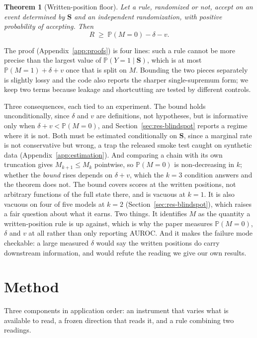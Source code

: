 \documentclass{article}
\newtheorem{theorem}{Theorem}
\newcommand{\gate}{\mathbf{S}}
\begin{document}
\begin{theorem}[Written-position floor]
\label{thm:floor}
Let a rule, randomized or not, accept on an event determined by $\gate$ and an independent
randomization, with positive probability of accepting. Then
\[
R\;\ge\;\mathbb{P}(M=0)-\delta-v .
\]
\end{theorem}

The proof (Appendix~\ref{app:proofs}) is four lines: such a rule cannot be more precise than the
largest value of $\mathbb{P}(Y=1\mid\gate)$, which is at most $\mathbb{P}(M=1)+\delta+v$ once that is
split on $M$. Bounding the two pieces separately is slightly lossy and the code also reports the
sharper single-supremum form; we keep two terms because leakage and shortcutting are tested by
different controls.

Three consequences, each tied to an experiment. The bound holds unconditionally, since $\delta$ and
$v$ are definitions, not hypotheses, but is informative only when $\delta+v<\mathbb{P}(M{=}0)$, and
Section~\ref{sec:res-blindspot} reports a regime where it is not. Both must be estimated conditionally
on $\gate$, since a marginal rate is not conservative but wrong, a trap the released smoke test caught
on synthetic data (Appendix~\ref{app:estimation}). And comparing a chain with its own truncation gives
$M_{k+1}\le M_k$ pointwise, so $\mathbb{P}(M{=}0)$ is non-decreasing in $k$; whether the \emph{bound}
rises depends on $\delta+v$, which the $k{=}3$ condition answers and the theorem does not. The bound
covers scores at the written positions, not arbitrary functions of the full state there, and is
vacuous at $k=1$. It is also vacuous on four of five models at $k{=}2$
(Section~\ref{sec:res-blindspot}), which raises a fair question about what it earns. Two things. It
identifies $M$ as the quantity a written-position rule is up against, which is why the paper measures
$\mathbb{P}(M{=}0)$, $\delta$ and $v$ at all rather than only reporting AUROC. And it makes the
failure mode checkable: a large measured $\delta$ would say the written positions do carry downstream
information, and would refute the reading we give our own results.

\section{Method}

Three components in application order: an instrument that varies what is available to read, a frozen
direction that reads it, and a rule combining two readings.
\end{document}
